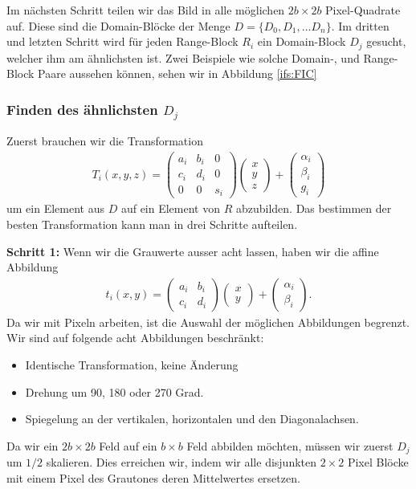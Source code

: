 Im nächsten Schritt teilen wir das Bild in alle möglichen $2b \times 2b$ Pixel-Quadrate auf. Diese sind die Domain-Blöcke der Menge $D = \{D_0,D_1,...D_n\}$. 
Im dritten und letzten Schritt wird für jeden Range-Block $R_i$ ein Domain-Block $D_j$ gesucht, welcher ihm am ähnlichsten ist.
Zwei Beispiele wie solche Domain-, und Range-Block Paare aussehen können, sehen wir in Abbildung \ref{ifs:FIC}

\subsubsection{Finden des ähnlichsten $D_j$}
Zuerst brauchen wir die Transformation 
\begin{align*}
	T_i(x,y,z) = 
	\begin{pmatrix}
		a_i & b_i & 0 \\
		c_i & d_i & 0 \\
		0 & 0 & s_i
	\end{pmatrix}
	\begin{pmatrix}
		x \\
		y \\
		z
	\end{pmatrix}
	+
	\begin{pmatrix}
		\alpha_i \\
		\beta_i \\
		g_i
	\end{pmatrix}
\end{align*}
um ein Element aus $D$ auf ein Element von $R$ abzubilden. 
Das bestimmen der besten Transformation kann man in drei Schritte aufteilen.

\textbf{Schritt 1: }Wenn wir die Grauwerte ausser acht lassen, haben wir die affine Abbildung
\begin{align}
	t_i(x,y) = 	
	\begin{pmatrix}
		a_i & b_i \\
		c_i & d_i
	\end{pmatrix}
	\begin{pmatrix}
		x \\
		y
	\end{pmatrix}
	+
	\begin{pmatrix}
		\alpha_i \\
		\beta_i
	\end{pmatrix}.
\label{ifs:affTrans}
\end{align}
Da wir mit Pixeln arbeiten, ist die Auswahl der möglichen Abbildungen begrenzt.
Wir sind auf folgende acht Abbildungen beschränkt:
\begin{itemize}
	\item Identische Transformation, keine Änderung
	\item Drehung um 90, 180 oder 270 Grad.
	\item Spiegelung an der vertikalen, horizontalen und den Diagonalachsen.
\end{itemize}
Da wir ein $2b \times 2b$ Feld auf ein $b \times b$ Feld abbilden möchten, müssen wir zuerst $D_j$ um $1/2$ skalieren.
Dies erreichen wir, indem wir alle disjunkten $2 \times 2$ Pixel Blöcke mit einem Pixel des Grautones deren Mittelwertes ersetzen.

